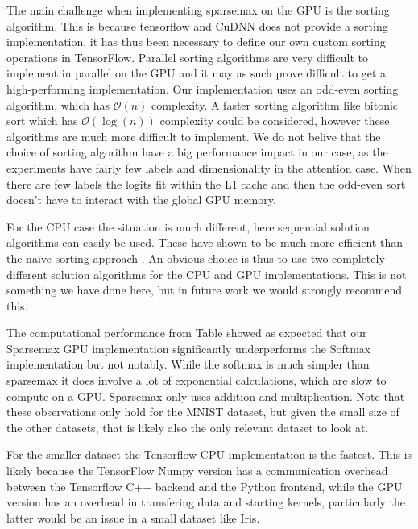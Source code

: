 The main challenge when implementing sparsemax on the GPU is the sorting algorithm. This is because tensorflow and CuDNN does not provide a sorting implementation, it has thus been necessary to define our own custom sorting operations in TensorFlow. Parallel sorting algorithms are very difficult to implement in parallel on the GPU and it may as such prove difficult to get a high-performing implementation. Our implementation uses an odd-even sorting algorithm, which has $\mathcal{O}(n)$ complexity. A faster sorting algorithm like bitonic sort which has $\mathcal{O}(\log(n))$ complexity could be considered, however these algorithms are much more difficult to implement. We do not belive that the choice of sorting algorithm have a big performance impact in our case, as the experiments have fairly few labels and dimensionality in the attention case. When there are few labels the logits fit within the L1 cache and then the odd-even sort doesn't have to interact with the global GPU memory. 

For the CPU case the situation is much different, here sequential solution algorithms can easily be used. These have shown to be much more efficient than the naïve sorting approach \cite{Liu2016}. An obvious choice is thus to use two completely different solution algorithms for the CPU and GPU implementations. This is not something we have done here, but in future work we would strongly recommend this.

The computational performance from Table \label{tab:timings} showed as expected that our Sparsemax GPU implementation significantly underperforms the Softmax implementation but not notably. While the softmax is much simpler than sparsemax it does involve a lot of exponential calculations, which are slow to compute on a GPU. Sparsemax only uses addition and multiplication. Note that these observations only hold for the MNIST dataset, but given the small size of the other datasets, that is likely also the only relevant dataset to look at.

For the smaller dataset the Tensorflow CPU implementation is the fastest. This is likely because the TensorFlow Numpy version has a communication overhead between the Tensorflow C++ backend and the Python frontend, while the GPU version has an overhead in transfering data and starting kernels, particularly the latter would be an issue in a small dataset like Iris.

